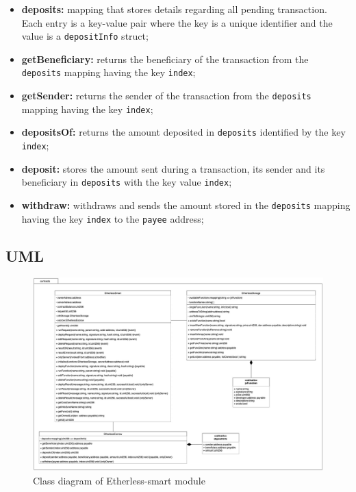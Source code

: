 	\begin{itemize}
		\item \textbf{deposits:} mapping that stores details regarding all pending transaction. Each entry is a key-value pair where the key is a unique identifier and the value is a \texttt{depositInfo} struct;	
		\end{itemize}
	\begin{itemize}
		\item \textbf{getBeneficiary:} returns the beneficiary of the transaction from the \texttt{deposits} mapping having the key \texttt{index};
		\item \textbf{getSender:} returns the sender of the transaction from the \texttt{deposits} mapping having the key \texttt{index};
		\item \textbf{depositsOf:} returns the amount deposited in \texttt{deposits} identified by the key \texttt{index};
		\item \textbf{deposit:} stores the amount sent during a transaction, its sender and its beneficiary in \texttt{deposits} with the key value \texttt{index};
		\item \textbf{withdraw:} withdraws and sends the amount stored in the \texttt{deposits} mapping having the key \texttt{index} to the \texttt{payee} address;
	\end{itemize}

\subsection{UML}
\begin{figure}[H]
		\centering
		\includegraphics[width=1\linewidth]{diagrammi/etherless-smart/Etherless-smart.jpg}
		\caption{Class diagram of Etherless-smart module}
	\end{figure}
		

